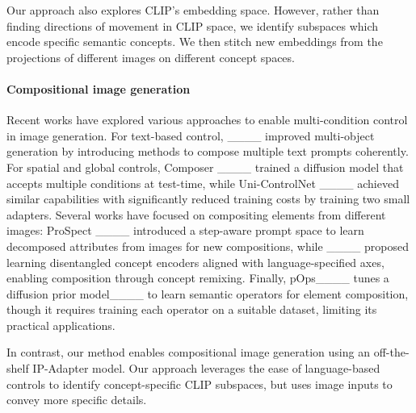 Our approach also explores CLIP's embedding space. However, rather than finding directions of movement in CLIP space, we identify subspaces which encode specific semantic concepts. We then stitch new embeddings from the projections of different images on different concept spaces.

\paragraph{\textbf{Compositional image generation}}
Recent works have explored various approaches to enable multi-condition control in image generation. For text-based control, ____ improved multi-object generation by introducing methods to compose multiple text prompts coherently. For spatial and global controls, Composer ____ trained a diffusion model that accepts multiple conditions at test-time, while Uni-ControlNet ____ achieved similar capabilities with significantly reduced training costs by training two small adapters. Several works have focused on compositing elements from different images: ProSpect ____ introduced a step-aware prompt space to learn decomposed attributes from images for new compositions, while ____ proposed learning disentangled concept encoders aligned with language-specified axes, enabling composition through concept remixing. Finally, pOps____ tunes a diffusion prior model____ to learn semantic operators for element composition, though it requires training each operator on a suitable dataset, limiting its practical applications.

In contrast, our method enables compositional image generation using an off-the-shelf IP-Adapter model. Our approach leverages the ease of language-based controls to identify concept-specific CLIP subspaces, but uses image inputs to convey more specific details.